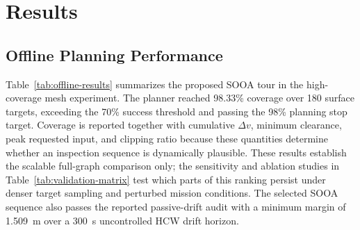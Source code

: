 \section{Results}
\label{sec:results}

\subsection{Offline Planning Performance}

Table~\ref{tab:offline-results} summarizes the proposed SOOA tour in the
high-coverage mesh experiment. The planner reached 98.33\% coverage over
180 surface targets, exceeding the 70\% success threshold and passing the 98\%
planning stop target. Coverage is reported together with cumulative
$\Delta v$, minimum clearance, peak requested input, and clipping ratio because
these quantities determine whether an inspection sequence is dynamically
plausible. These results establish the scalable full-graph comparison only;
the sensitivity and ablation studies in Table~\ref{tab:validation-matrix} test
which parts of this ranking persist under denser target sampling and perturbed
mission conditions. The selected SOOA sequence also passes the reported
passive-drift audit with a minimum margin of 1.509~m over a 300~s uncontrolled
HCW drift horizon.

